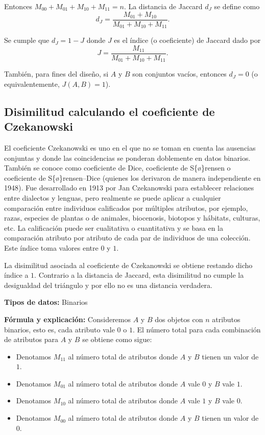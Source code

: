 \documentclass[
]{book}
\begin{document}
Entonces \(M_{00}+ M_{01} + M_{10} + M_{11} = n\). La distancia de Jaccard \(d_{J}\) se define como
\[
      d_{J} = \frac{M_{01} + M_{10}}{M_{01} + M_{10} + M_{11}}.
   \]

Se cumple que \(d_{J} = 1- J\) donde \(J\) es el índice (o coeficiente) de Jaccard dado por
\[
      J = \frac{M_{11}}{M_{01} + M_{10} + M_{11}}.
   \]

También, para fines del diseño, si \(A\) y \(B\) son conjuntos vacíos, entonces \(d_{J} = 0\) (o equivalentemente, \(J(A,B) = 1\)).

\subsection{Disimilitud calculando el coeficiente de Czekanowski}\label{disimilitud-calculando-el-coeficiente-de-czekanowski}

El coeficiente Czekanowski es uno en el que no se toman en cuenta las ausencias conjuntas y donde las coincidencias se ponderan doblemente en datos binarios. También se conoce como coeficiente de Dice, coeficiente de S\{\o\}rensen o coeficiente de S\{\o\}rensen--Dice (quienes los derivaron de manera independiente en 1948). Fue desarrollado en 1913 por Jan Czekanowski para establecer relaciones entre dialectos y lenguas, pero realmente se puede aplicar a cualquier comparación entre individuos calificados por múltiples atributos, por ejemplo, razas, especies de plantas o de animales, biocenosis, biotopos y hábitats, culturas, etc. La calificación puede ser cualitativa o cuantitativa y se basa en la comparación atributo por atributo de cada par de individuos de una colección. Este índice toma valores entre \(0\) y \(1\).

La disimilitud asociada al coeficiente de Czekanowski se obtiene restando dicho índice a \(1\). Contrario a la distancia de Jaccard, esta disimilitud no cumple la desigualdad del triángulo y por ello no es una distancia verdadera.

\textbf{Tipos de datos:} Binarios

\textbf{Fórmula y explicación:} Consideremos \(A\) y \(B\) dos objetos con \(n\) atributos binarios, esto es, cada atributo vale \(0\) o \(1\). El número total para cada combinación de atributos para \(A\) y \(B\) se obtiene como sigue:

\begin{itemize}
\item
  Denotamos \(M_{11}\) al número total de atributos donde \(A\) y \(B\) tienen un valor de \(1\).
\item
  Denotamos \(M_{01}\) al número total de atributos donde \(A\) vale \(0\) y \(B\) vale \(1\).
\item
  Denotamos \(M_{10}\) al número total de atributos donde \(A\) vale \(1\) y \(B\) vale \(0\).
\item
  Denotamos \(M_{00}\) al número total de atributos donde \(A\) y \(B\) tienen un valor de \(0\).
\end{itemize}
\end{document}
